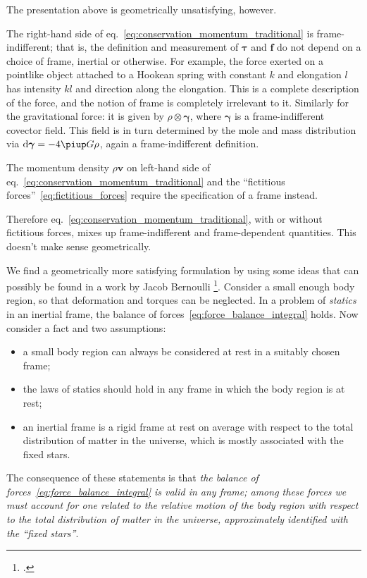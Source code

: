 \documentclass[\ifafour a4paper,12pt,\else a5paper,10pt,\fi%
onecolumn,oneside,article,%
british%
]{memoir}
\theoremstyle{remark}
\theoremstyle{innote}
\newcommand*{\citep}{\footcites}%
\newcommand*{\pu}{\piup}%
\newcommand*{\di}{\mathrm{d}}%
\renewcommand*{\|}{\nonscript\,\vert\nonscript\;\mathopen{}}
\newcommand*{\sect}{\S}%
\newcommand*{\eqn}{eq.}%
\newcommand*{\ydd}{\rho}
\newcommand*{\yd}{\ydd}
\newcommand*{\yTT}{\tau}
\newcommand*{\yT}{\bm{\yTT}}
\newcommand*{\ybb}{f}
\newcommand*{\yb}{\bm{\ybb}}
\newcommand*{\yvvt}{v}
\newcommand*{\yvt}{\bm{\yvvt}}
\newcommand*{\yffg}{\gamma}
\newcommand*{\yfg}{\bm{\yffg}}
\begin{document}
\bigskip

The presentation above is geometrically unsatisfying, however.

The right-hand side of \eqn~\eqref{eq:conservation_momentum_traditional} is
frame-indifferent; that is, the definition and measurement of $\yT$ and
$\yb$ do not depend on a choice of frame, inertial or otherwise. For
example, the force exerted on a pointlike object attached to a Hookean
spring with constant $k$ and elongation $l$ has intensity $kl$ and
direction along the elongation. This is a complete description of the
force, and the notion of frame is completely irrelevant to it. Similarly
for the gravitational force: it is given by $\yd\otimes\yfg$, where $\yfg$
is a frame-indifferent covector field. This field is in turn determined by
the mole and mass distribution via $\di\yfg = - 4\pu G \yd$, again a
frame-indifferent definition.

The momentum density $\yd\yvt$ on left-hand side of
\eqn~\eqref{eq:conservation_momentum_traditional} and the
\enquote{fictitious forces}~\eqref{eq:fictitious_forces} require the
specification of a frame instead.

Therefore \eqn~\eqref{eq:conservation_momentum_traditional}, with or
without fictitious forces, mixes up frame-indifferent and frame-dependent
quantities. This doesn't make sense geometrically.

We find a geometrically more satisfying formulation by using some ideas
that can possibly be found in a work by Jacob Bernoulli
\citep{bernoulli1703}[see][p.~104]{truesdell1968}{noll1963}[\sect~I.13]{truesdell1977_r1991}. Consider a small
enough body region, so that deformation and torques can be neglected. In a
problem of \emph{statics} in an inertial frame, the balance of
forces~\eqref{eq:force_balance_integral} holds. Now consider a fact and two
assumptions:
\begin{itemize}
\item a small body region can always be considered at rest in a suitably
  chosen frame;
\item the laws of statics should hold in any frame in which the body region
  is at rest;
\item an inertial frame is a rigid frame at rest on average with respect to
  the total distribution of matter in the universe, which is mostly
  associated with the fixed stars.
\end{itemize}
The consequence of these statements is that \emph{the balance of
  forces~\eqref{eq:force_balance_integral} is valid in any frame; among
  these forces we must account for one related to the relative motion of
  the body region with respect to the total distribution of matter in the
  universe, approximately identified with the \enquote{fixed stars}}.
\end{document}
